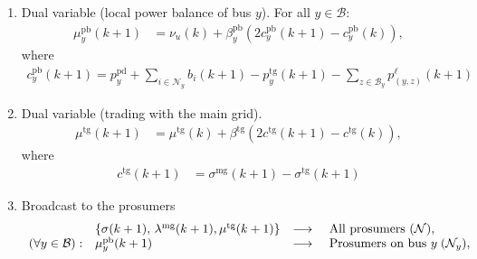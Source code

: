 \documentclass[10pt]{article}
\newcommand{\mc}{\mathcal}
\newcommand{\0}{\mathbf{0}}
\newcommand{\1}{\mathbf{1}}
\begin{document}
\begin{algorithm}[H]
\begin{algorithmic}[1]
\begin{enumerate}[(1)]
	 \smallskip
	 \item Dual variable (local power balance of bus $y$). For all $y \in \mc B$: 
	\begin{align*}
	\mu_y^{\text{pb}}(k+1) &= \nu_u(k) + \beta^{\text{pb}}_y (2 c^{\text{pb}}_y(k+1)- c^{\text{pb}}_y(k)),
	\end{align*}	 
where
\begin{align*}
	c^{\text{pb}}_y(k+1)   = p_y^{\text{pd}} + \sum_{i \in \mc N_y} b_i(k+1)- p^{\text{tg}}_y(k+1) - \sum_{z \in \mc B_y} p^\ell_{(y,z)} (k+1)
\end{align*}	
		 \smallskip
	 \item Dual variable (trading with the main grid). 
	\begin{align*}
	\mu^{\text{tg}}(k+1) &= \mu^{\text{tg}}(k) + \beta^{\text{tg}} (2c^{\text{tg}}(k+1)-c^{\text{tg}}(k)),
	\end{align*}	 
where
\begin{align*}
	c^{\text{tg}}(k+1) &= \sigma^{\text{mg}}
	(k+1)- \sigma^{\text{tg}}(k+1)
\end{align*}	 
	 \smallskip
	 \item Broadcast to the prosumers
	 	\begin{align*}
	\begin{array}{c l c l }
& \{ \sigma(k+1), \, \lambda^{\text{mg}}(k+1), \mu^{\text{tg}}(k+1) \} &
	\longrightarrow & \text{ All prosumers }(\mc N), \\
 (\forall y \in \mc B): &	\mu^{\text{pb}}_y(k+1)  &	\longrightarrow & \text{ Prosumers on bus } y \; (\mc N_y),  
	\end{array}
     	\end{align*}
	
	\end{enumerate}
	
\end{algorithmic}
\end{algorithm}
\end{document}
